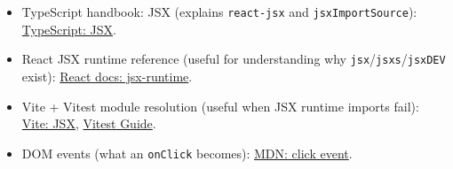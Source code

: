 \begin{itemize}
  \item TypeScript handbook: JSX (explains \texttt{react-jsx} and \texttt{jsxImportSource}):
    \href{https://www.typescriptlang.org/docs/handbook/jsx.html}{TypeScript: JSX}.
  \item React JSX runtime reference (useful for understanding why \texttt{jsx}/\texttt{jsxs}/\texttt{jsxDEV} exist):
    \href{https://react.dev/reference/react/jsx-runtime}{React docs: jsx-runtime}.
  \item Vite + Vitest module resolution (useful when JSX runtime imports fail):
    \href{https://vite.dev/guide/features.html#jsx}{Vite: JSX},
    \href{https://vitest.dev/guide/}{Vitest Guide}.
  \item DOM events (what an \texttt{onClick} becomes):
    \href{https://developer.mozilla.org/en-US/docs/Web/API/Element/click_event}{MDN: click event}.
\end{itemize}
